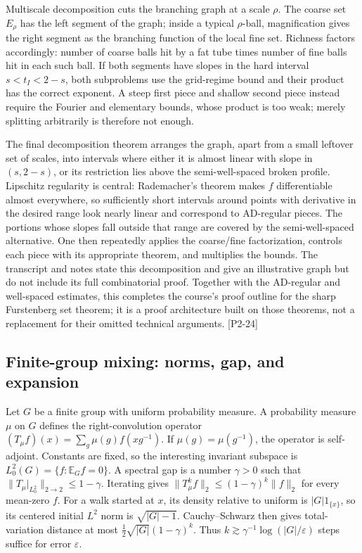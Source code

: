 Multiscale decomposition cuts the branching graph at a scale \(\rho\). The coarse set \(E_\rho\) has the left segment of the graph; inside a typical \(\rho\)-ball, magnification gives the right segment as the branching function of the local fine set. Richness factors accordingly: number of coarse balls hit by a fat tube times number of fine balls hit in each such ball. If both segments have slopes in the hard interval \(s<t_I<2-s\), both subproblems use the grid-regime bound and their product has the correct exponent. A steep first piece and shallow second piece instead require the Fourier and elementary bounds, whose product is too weak; merely splitting arbitrarily is therefore not enough.

The final decomposition theorem arranges the graph, apart from a small leftover set of scales, into intervals where either it is almost linear with slope in \((s,2-s)\), or its restriction lies above the semi-well-spaced broken profile. Lipschitz regularity is central: Rademacher's theorem makes \(f\) differentiable almost everywhere, so sufficiently short intervals around points with derivative in the desired range look nearly linear and correspond to AD-regular pieces. The portions whose slopes fall outside that range are covered by the semi-well-spaced alternative. One then repeatedly applies the coarse/fine factorization, controls each piece with its appropriate theorem, and multiplies the bounds. The transcript and notes state this decomposition and give an illustrative graph but do not include its full combinatorial proof. Together with the AD-regular and well-spaced estimates, this completes the course's proof outline for the sharp Furstenberg set theorem; it is a proof architecture built on those theorems, not a replacement for their omitted technical arguments. {[}P2-24{]}

\subsection{Finite-group mixing: norms, gap, and expansion}\label{04-visual-computing-ii-ch033-finite-group-mixing-norms-gap-and-expansion}

\hypertarget{04-visual-computing-ii-ch033-finite-group-mixing-norms-gap-and-expansion}{}

Let \(G\) be a finite group with uniform probability measure. A probability measure \(\mu\) on \(G\) defines the right-convolution operator \((T_\mu f)(x)=\sum_g\mu(g)f(xg^{-1})\). If \(\mu(g)=\mu(g^{-1})\), the operator is self-adjoint. Constants are fixed, so the interesting invariant subspace is \(L^2_0(G)=\{f:\mathbb E_G f=0\}\). A spectral gap is a number \(\gamma>0\) such that \(\|T_\mu|_{L^2_0}\|_{2\to2}\le1-\gamma\). Iterating gives \(\|T_\mu^k f\|_2\le(1-\gamma)^k\|f\|_2\) for every mean-zero \(f\). For a walk started at \(x\), its density relative to uniform is \(|G|1_{\{x\}}\), so its centered initial \(L^2\) norm is \(\sqrt{|G|-1}\). Cauchy--Schwarz then gives total-variation distance at most \(\tfrac12\sqrt{|G|}(1-\gamma)^k\). Thus \(k\gtrsim\gamma^{-1}\log(|G|/\varepsilon)\) steps suffice for error \(\varepsilon\).

